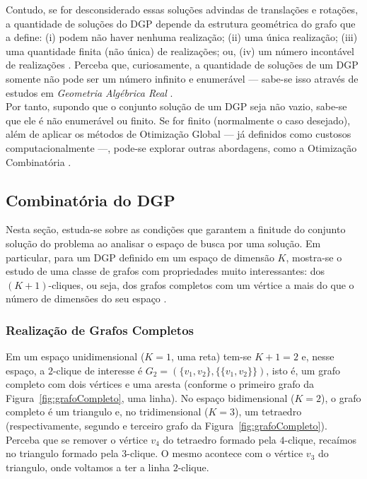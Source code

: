 Contudo, se for desconsiderado essas soluções advindas de translações e rotações, a quantidade de soluções do DGP depende da estrutura geométrica do grafo que a define: (i) podem não haver nenhuma realização; (ii) uma única realização; (iii) uma quantidade finita (não única) de realizações; ou, (iv) um número incontável de realizações \cite{libertiEDG}. Perceba que, curiosamente, a quantidade de soluções de um DGP somente não pode ser um número infinito e enumerável --- sabe-se isso através de estudos em \textit{Geometria Algébrica Real} \cite{benedettireal}.\\
 
Por tanto, supondo que o conjunto solução de um DGP seja não vazio, sabe-se que ele é não enumerável ou finito. Se for finito (normalmente o caso desejado), além de aplicar os métodos de Otimização Global --- já definidos como custosos computacionalmente ---, pode-se explorar outras abordagens, como a Otimização Combinatória \cite{carlileBook31Coloquio}. 

\subsection{Combinatória do DGP}

Nesta seção, estuda-se sobre as condições que garantem a finitude do conjunto solução do problema ao analisar o espaço de busca por uma solução. Em particular, para um DGP definido em um espaço de dimensão $K$, mostra-se o estudo de uma classe de grafos com propriedades muito interessantes: dos $(K+1)$-cliques, ou seja, dos grafos completos com um vértice a mais do que o número de dimensões do seu espaço \cite{libertiEDG}.

\subsubsection{Realização de Grafos Completos}

Em um espaço unidimensional ($K = 1$, uma reta) tem-se $K+1 = 2$ e, nesse espaço, a $2$-clique de interesse é $G_2 = (\{v_1,v_2\}, \{\{v_1,v_2\}\})$, isto é, um grafo completo com dois vértices e uma aresta (conforme o primeiro grafo da Figura~\ref{fig:grafoCompleto}, uma linha). No espaço bidimensional ($K=2$), o grafo completo é um triangulo e, no tridimensional ($K=3$), um tetraedro (respectivamente, segundo e terceiro grafo da Figura~\ref{fig:grafoCompleto}). Perceba que se remover o vértice $v_4$ do tetraedro formado pela $4$-clique, recaímos no triangulo formado pela $3$-clique. O mesmo acontece com o vértice $v_3$ do triangulo, onde voltamos a ter a linha $2$-clique. 

